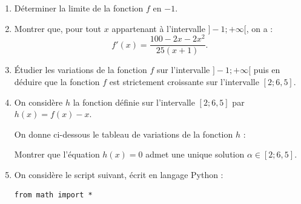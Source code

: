 \documentclass[11pt,a4paper]{article}
\begin{document}
\begin{enumerate}
  \item Déterminer la limite de la fonction $f$ en $-1$.
  \item Montrer que, pour tout $x$ appartenant à l'intervalle $]-1;+\infty[$, on a :
  \[
f'(x)=\dfrac{100-2x-2x^2}{25(x+1)}.
  \]
  \item Étudier les variations de la fonction $f$ sur l'intervalle $]-1;+\infty[$ puis en déduire que la fonction $f$ est strictement croissante sur l'intervalle $[2;6{,}5]$.
  \item On considère $h$ la fonction définie sur l'intervalle $[2;6{,}5]$ par $h(x)=f(x)-x$.

  On donne ci-dessous le tableau de variations de la fonction $h$ :

  \begin{center}
  \end{center}
  Montrer que l'équation $h(x)=0$ admet une unique solution $\alpha\in[2;6{,}5]$.
  \item On considère le script suivant, écrit en langage Python :
\begin{Verbatim}[frame=single, fontsize=\small]
from math import *


\end{Verbatim}
\end{enumerate}
\end{document}
